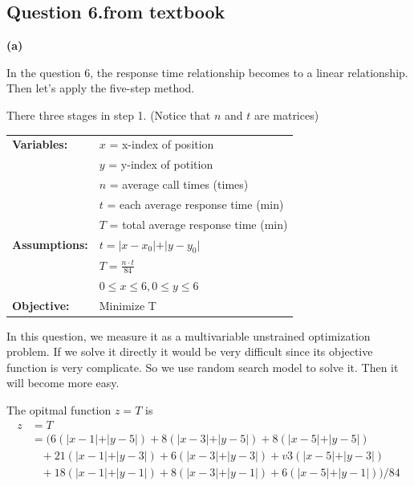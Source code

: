 \documentclass{report}
\begin{document}
\begin{spacing}{1.3541667}
\newpage
\section*{\bf Question 6.from textbook}\par
{\bf (a)}

In the question 6, the response time relationship becomes to a linear relationship. 
Then let's apply the five-step method. 

\hspace{-1.5em}{\bf Step 1. Ask the question}\par 
There three stages in step 1. (Notice that $n$ and $t$ are matrices)

\vspace{0.5em}
\begin{tabular}{ll}
    {\bf Variables:}
    &$x$ = x-index of position\\
    &$y$ = y-index of potition\\
    &$n$ = average call times (times)\\
    &$t$ = each average response time (min)\\
    &$T$ = total average response time (min)\\
    {\bf Assumptions:}
    &$t = \vert x-x_0\vert +\vert y-y_0\vert$\\
    &$T=\frac{n\cdot t}{84}$\\
    &$0\leq x \leq 6, 0\leq y\leq 6$\\
    {\bf Objective:}
    &Minimize T
\end{tabular}

\vspace{1em}
\hspace{-1.5em}{\bf Step 2. Select the modeling approach}\par
In this question, we measure it as a multivariable unstrained optimization problem. 
If we solve it directly it would be very difficult since its objective function is very complicate. 
So we use random search model to solve it. 
Then it will become more easy. 

\vspace{1em}
\hspace{-1.5em}{\bf Step 3. Formulate the model}\par
The opitmal function $z=T$ is 
\begin{align*}
   z&=T\\
   &=(6(\lvert x-1\vert+\vert y-5\rvert)+8(\lvert x-3\vert+\vert y-5\rvert)+8(\lvert x-5\vert+\vert y-5\rvert)\\
   &\;\;\;+21(\lvert x-1\vert+\vert y-3\rvert)+6(\lvert x-3\vert+\vert y-3\rvert)+v3(\lvert x-5\vert+\vert y-3\rvert)\\
   &\;\;\;+18(\lvert x-1\vert+\vert y-1\rvert)+8(\lvert x-3\vert+\vert y-1\rvert)+6(\lvert x-5\vert+\vert y-1\rvert))/84
\end{align*}


\end{spacing}
\end{document}
